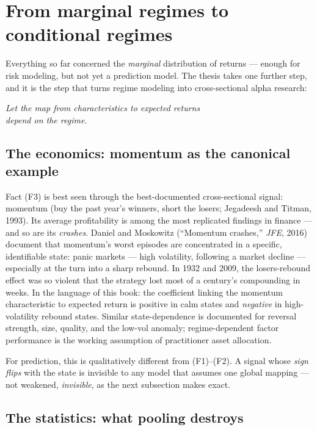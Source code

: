 \section{From marginal regimes to conditional regimes}\label{sec:conditional}

Everything so far concerned the \emph{marginal} distribution of returns ---
enough for risk modeling, but not yet a prediction model. The thesis takes
one further step, and it is the step that turns regime modeling into
cross-sectional alpha research:

\begin{center}
\emph{Let the map from characteristics to expected returns\\
depend on the regime.}
\end{center}

\subsection{The economics: momentum as the canonical example}

Fact (F3) is best seen through the best-documented cross-sectional signal:
momentum (buy the past year's winners, short the losers; Jegadeesh and
Titman, 1993). Its average profitability is among the most replicated
findings in finance --- and so are its \emph{crashes}. Daniel and Moskowitz
(``Momentum crashes,'' \emph{JFE}, 2016) document that momentum's worst
episodes are concentrated in a specific, identifiable state: panic markets
--- high volatility, following a market decline --- especially at the turn
into a sharp rebound. In 1932 and 2009, the losers-rebound effect was so
violent that the strategy lost most of a century's compounding in weeks. In
the language of this book: the coefficient linking the momentum
characteristic to expected return is positive in calm states and
\emph{negative} in high-volatility rebound states. Similar state-dependence
is documented for reversal strength, size, quality, and the
low-vol anomaly; regime-dependent factor performance is the working
assumption of practitioner asset allocation.

For prediction, this is qualitatively different from (F1)--(F2). A signal
whose \emph{sign flips} with the state is invisible to any model that
assumes one global mapping --- not weakened, \emph{invisible}, as the next
subsection makes exact.

\subsection{The statistics: what pooling destroys}\label{sec:signflip}

